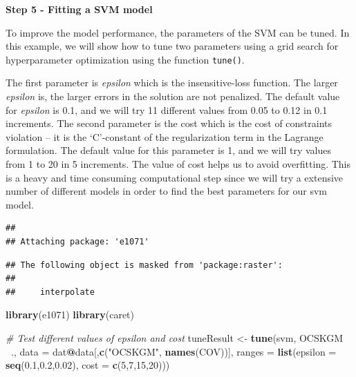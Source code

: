 \documentclass[10pt,b5paper,]{book}
\newenvironment{Shaded}{\begin{snugshade}}{\end{snugshade}}
\newcommand{\CommentTok}[1]{\textcolor[rgb]{0.56,0.35,0.01}{\textit{#1}}}
\newcommand{\DataTypeTok}[1]{\textcolor[rgb]{0.13,0.29,0.53}{#1}}
\newcommand{\DecValTok}[1]{\textcolor[rgb]{0.00,0.00,0.81}{#1}}
\newcommand{\FloatTok}[1]{\textcolor[rgb]{0.00,0.00,0.81}{#1}}
\newcommand{\KeywordTok}[1]{\textcolor[rgb]{0.13,0.29,0.53}{\textbf{#1}}}
\newcommand{\NormalTok}[1]{#1}
\newcommand{\OperatorTok}[1]{\textcolor[rgb]{0.81,0.36,0.00}{\textbf{#1}}}
\newcommand{\StringTok}[1]{\textcolor[rgb]{0.31,0.60,0.02}{#1}}
\theoremstyle{definition}
\theoremstyle{definition}
\theoremstyle{definition}
\theoremstyle{remark}
\begin{document}
\textbf{Step 5 - Fitting a SVM model}

To improve the model performance, the parameters of the SVM can be
tuned. In this example, we will show how to tune two parameters using a
grid search for hyperparameter optimization using the function
\texttt{tune()}.

The first parameter is \emph{epsilon} which is the insensitive-loss
function. The larger \emph{epsilon} is, the larger errors in the
solution are not penalized. The default value for \emph{epsilon} is 0.1,
and we will try 11 different values from 0.05 to 0.12 in 0.1 increments.
The second parameter is the cost which is the cost of constraints
violation -- it is the `C'-constant of the regularization term in the
Lagrange formulation. The default value for this parameter is 1, and we
will try values from 1 to 20 in 5 increments. The value of cost helps us
to avoid overfitting. This is a heavy and time consuming computational
step since we will try a extensive number of different models in order
to find the best parameters for our svm model.

\begin{verbatim}
## 
## Attaching package: 'e1071'
\end{verbatim}

\begin{verbatim}
## The following object is masked from 'package:raster':
## 
##     interpolate
\end{verbatim}

\begin{Shaded}
\begin{Highlighting}[]
\KeywordTok{library}\NormalTok{(e1071)}
\KeywordTok{library}\NormalTok{(caret)}

\CommentTok{# Test different values of epsilon and cost}
\NormalTok{  tuneResult <-}\StringTok{ }\KeywordTok{tune}\NormalTok{(svm, OCSKGM }\OperatorTok{~}\NormalTok{.,  }\DataTypeTok{data =}\NormalTok{ dat}\OperatorTok{@}\NormalTok{data[,}\KeywordTok{c}\NormalTok{(}\StringTok{"OCSKGM"}\NormalTok{,}
                                                         \KeywordTok{names}\NormalTok{(COV))],}
                     \DataTypeTok{ranges =} \KeywordTok{list}\NormalTok{(}\DataTypeTok{epsilon =} \KeywordTok{seq}\NormalTok{(}\FloatTok{0.1}\NormalTok{,}\FloatTok{0.2}\NormalTok{,}\FloatTok{0.02}\NormalTok{),}
                                   \DataTypeTok{cost =} \KeywordTok{c}\NormalTok{(}\DecValTok{5}\NormalTok{,}\DecValTok{7}\NormalTok{,}\DecValTok{15}\NormalTok{,}\DecValTok{20}\NormalTok{)))}
\end{Highlighting}
\end{Shaded}
\end{document}
